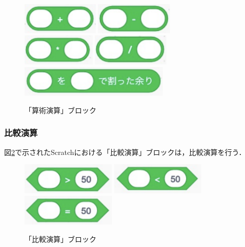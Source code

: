 \documentclass[10pt,a4j]{ltjsarticle}
\begin{document}
\begin{figure}[H]
  \centering
  \includegraphics[height=15mm]{images/add.pdf}
  \includegraphics[height=15mm]{images/sub.pdf} \\
  \includegraphics[height=15mm]{images/mul.pdf}
  \includegraphics[height=15mm]{images/div.pdf} \\
  \includegraphics[height=15mm]{images/rem.pdf}
  \caption{「算術演算」ブロック}
  \label{fig:math}
\end{figure}

\subsubsection{比較演算}
図\ref{fig:com}で示されたScratchにおける「比較演算」ブロックは，比較演算を行う．
\begin{figure}[H]
  \centering
  \includegraphics[height=15mm]{images/over.pdf}
  \includegraphics[height=15mm]{images/less.pdf}
  \includegraphics[height=15mm]{images/equ.pdf}
  \caption{「比較演算」ブロック}
  \label{fig:com}
\end{figure}
\end{document}
